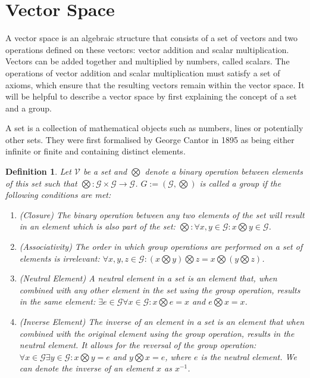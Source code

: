 \documentclass[a4paper,12pt]{book}
\newcommand{\set}[1]{\mathcal{#1}}
\newcommand{\operation}{\bigotimes}
\newtheorem{definition}{Definition}[section]
\begin{document}
	\section{Vector Space}
	A vector space is an algebraic structure that consists of a set of vectors and two operations defined on these vectors: vector addition and scalar multiplication. Vectors can be added together and multiplied by numbers, called scalars. The operations of vector addition and scalar multiplication must satisfy a set of axioms, which ensure that the resulting vectors remain within the vector space. It will be helpful to describe a vector space by first explaining the concept of a set and a group. 
	
	A set is a collection of mathematical objects such as numbers, lines or potentially other sets. They were first formalised by George Cantor in 
	1895 \cite{cantor1895beitrage} as being either infinite or finite and containing distinct elements. 
	\begin{definition}
		\normalfont
		Let $ \mathcal{V} $ be a set and $ \operation $ denote a binary operation between elements of this set such that $ \operation : \set{G} \times \set{G} \rightarrow \set{G} $. $G := (\set{G}, \operation)$ is called a group  \cite[page 36]{mml_book} if the following conditions are met:
		\begin{enumerate}
			\item (Closure) The binary operation between any two elements of the set will result in an element which is also part of the set: $ \operation : \forall x,y \in \set{G} : x \operation y \in \set{G} $.
			\item (Associativity) The order in which group operations are performed on a set of elements is irrelevant: $ \forall x, y, z \in \set{G} : (x \operation y) \operation z = x \operation (y \operation z) $.
			\item (Neutral Element) A neutral element in a set is an element that, when combined with any other element in the set using the group operation, results in the same element: $ \exists e  \in \set{G} \forall x \in \set{G} : x \operation e = x$ and $ e \operation x = x $.
			\item (Inverse Element) The inverse of an element in a set is an element that when combined with the original element using the group operation, results in the neutral element. It allows for the reversal of the group operation: $ \forall x \in \set{G} \exists y \in \set{G} :  x \operation y = e$ and $ y \operation x = e $, where $ e $ is the neutral element. We can denote the inverse of an element $ x $ as $ x^{-1} $.
		\end{enumerate}
	\end{definition}
		
\end{document}
